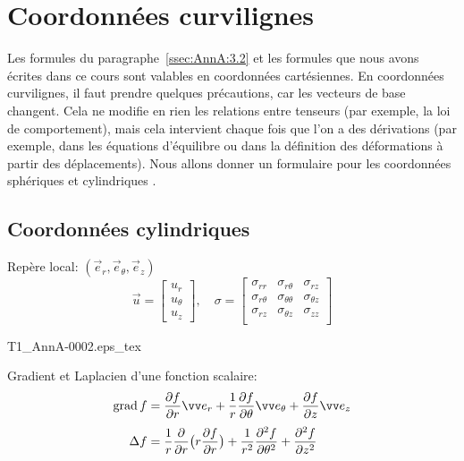 \section{Coordonnées curvilignes}
Les formules du paragraphe~\ref{ssec:AnnA:3.2} et les formules que nous avons écrites dans ce cours sont valables en coordonnées cartésiennes.
En coordonnées curvilignes, il faut prendre quelques précautions, car les vecteurs de base changent.
Cela ne modifie en rien les relations entre tenseurs (par exemple, la loi de comportement), mais cela intervient chaque fois que l'on a des dérivations (par exemple, dans les équations d'équilibre ou dans la définition des déformations à partir des déplacements).
Nous allons donner un formulaire pour les coordonnées sphériques et cylindriques .
\subsection{Coordonnées cylindriques}
\begin{multicols}{2}
\noindent Repère local: $(\vec{e}_r,\vec{e}_{\theta},\vec{e}_{z})$
    \begin{displaymath}
        \vec{u} = 
        \begin{bmatrix}
            u_r \\
            u_{\theta} \\
            u_z
        \end{bmatrix}, \quad
        \mathbb{\sigma} = 
        \begin{bmatrix}
            \sigma_{rr} & \sigma_{r\theta} & \sigma_{rz} \\
            \sigma_{r\theta} & \sigma_{\theta\theta} & \sigma_{\theta z} \\
            \sigma_{rz} & \sigma_{\theta z} & \sigma_{zz} \\
        \end{bmatrix}
    \end{displaymath}
 
    \columnbreak

    \def\svgheight{3.5cm}
    {T1_AnnA-0002.eps_tex}

\end{multicols}
\noindent Gradient et Laplacien d'une fonction scalaire:
\begin{align*}
    \grad f &= \frac{\partial f}{\partial r} \vec{e}_r + \frac{1}{r} \frac{\partial f}{\partial \theta} \vec{e}_{\theta} + \frac{\partial f}{\partial z} \vec{e}_z \\[3pt]
    \Delta f &= \frac{1}{r} \frac{\partial}{\partial r} \bigl( r \frac{\partial f}{\partial r} \bigr) + \frac{1}{r^{2}}\frac{\partial^2 f}{\partial \theta^2} + \frac{\partial^2 f}{\partial z^2}
\end{align*}
